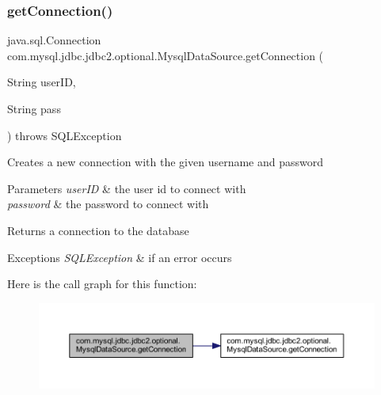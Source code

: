 \subsubsection{\texorpdfstring{get\+Connection()}{getConnection()}\hspace{0.1cm}{\footnotesize\ttfamily [2/3]}}
{\footnotesize\ttfamily java.\+sql.\+Connection com.\+mysql.\+jdbc.\+jdbc2.\+optional.\+Mysql\+Data\+Source.\+get\+Connection (\begin{DoxyParamCaption}\item[{String}]{user\+ID,  }\item[{String}]{pass }\end{DoxyParamCaption}) throws S\+Q\+L\+Exception}

Creates a new connection with the given username and password


\begin{DoxyParams}{Parameters}
{\em user\+ID} & the user id to connect with \\
\hline
{\em password} & the password to connect with\\
\hline
\end{DoxyParams}
\begin{DoxyReturn}{Returns}
a connection to the database
\end{DoxyReturn}

\begin{DoxyExceptions}{Exceptions}
{\em S\+Q\+L\+Exception} & if an error occurs \\
\hline
\end{DoxyExceptions}
Here is the call graph for this function\+:
\nopagebreak
\begin{figure}[H]
\begin{center}
\leavevmode
\includegraphics[width=350pt]{classcom_1_1mysql_1_1jdbc_1_1jdbc2_1_1optional_1_1_mysql_data_source_a63e6a1f58e687db6972674f2e2427141_cgraph}
\end{center}
\end{figure}
\mbox{\label{classcom_1_1mysql_1_1jdbc_1_1jdbc2_1_1optional_1_1_mysql_data_source_ad532c3e1663ec177fe6863bd0c8ca47d}} 
